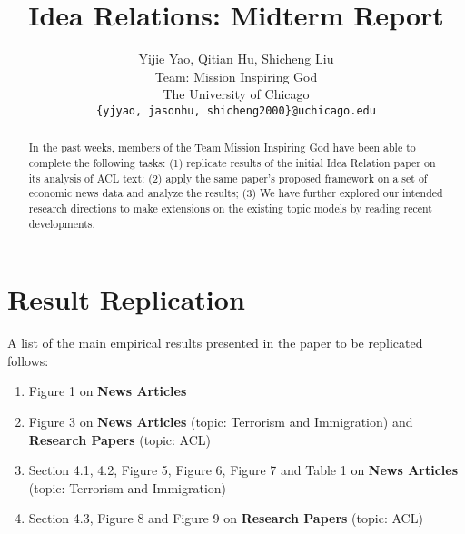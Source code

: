 \documentclass[11pt,a4paper]{article}
\title{Idea Relations: Midterm Report}
\author{Yijie Yao, Qitian Hu, Shicheng Liu \\
Team: Mission Inspiring God \\
The University of Chicago  \\
  \texttt{\{yjyao, jasonhu, shicheng2000\}@uchicago.edu} \\}
\begin{document}
\maketitle
\begin{abstract}
In the past weeks, members of the Team Mission Inspiring God have been able to 
complete the following tasks: (1) replicate results of the initial Idea Relation paper
\citet{chenhao-idea-relations} on its analysis of ACL text; (2) apply the same paper's 
proposed framework on a set of economic news data \cite{econ-news-dataset} and 
analyze the results; (3) We have further explored our intended research directions to make extensions on the existing topic models by reading recent developments.
\end{abstract}

\section{Result Replication}

A list of the main empirical results presented in the paper to be replicated
\cite{chenhao-idea-relations} follows:

\begin{enumerate}
  \item Figure 1 on \textbf{News Articles}
  \item Figure 3 on \textbf{News Articles} (topic: Terrorism and Immigration)
   and \textbf{Research Papers} (topic: ACL)
  \item Section 4.1, 4.2, Figure 5, Figure 6, Figure 7 and Table 1 on 
  \textbf{News Articles} (topic: Terrorism and Immigration)
  \item Section 4.3, Figure 8 and Figure 9 on \textbf{Research Papers} 
  (topic: ACL)
\end{enumerate}


\end{document}
